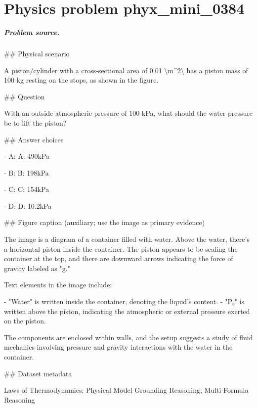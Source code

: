 
\chapter{Physics problem phyx\_mini\_0384}
\label{ch:PhyXMiniProblems_problem_phyx_mini_0384}

\paragraph{Problem source.}
\#\# Physical scenario

A piston/cylinder with a cross-sectional area of 0.01 \textbackslash{}m\textasciicircum{}2\textbackslash{} has a piston mass of 100 kg resting on the stops, as shown in the figure.

\#\# Question

With an outside atmospheric pressure of 100 kPa, what should the water pressure be to lift the piston?

\#\# Answer choices

- A: A: 490kPa

- B: B: 198kPa

- C: C: 154kPa

- D: D: 10.2kPa

\#\# Figure caption (auxiliary; use the image as primary evidence)

The image is a diagram of a container filled with water. Above the water, there's a horizontal piston inside the container. The piston appears to be sealing the container at the top, and there are downward arrows indicating the force of gravity labeled as "g."

Text elements in the image include:

- "Water" is written inside the container, denoting the liquid's content.
- "P₀" is written above the piston, indicating the atmospheric or external pressure exerted on the piston.

The components are enclosed within walls, and the setup suggests a study of fluid mechanics involving pressure and gravity interactions with the water in the container.

\#\# Dataset metadata

Laws of Thermodynamics; Physical Model Grounding Reasoning, Multi-Formula Reasoning

